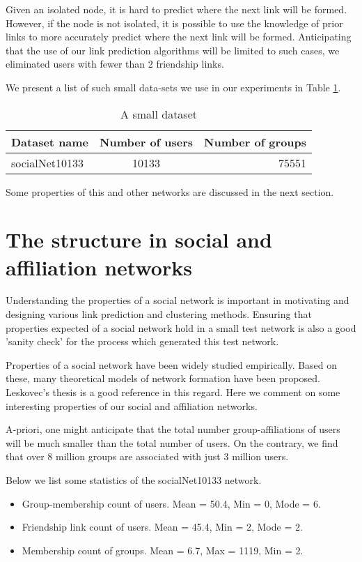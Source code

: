 \documentclass{report}
\begin{document}
Given an isolated node, it is hard to predict where the next link will be formed. However, if the node is not isolated, it is possible to use the knowledge of prior links to more accurately predict where the next link will be formed. Anticipating that the use of our link prediction algorithms will be limited to such cases, we eliminated users with fewer than 2 friendship links.

We present a list of such small data-sets we use in our experiments in Table \ref{tab:datasets}.
\begin{table}
\centering
\begin{tabular}{|l || c | r |}
\hline
Dataset name& Number of users & Number of groups\\
\hline
socialNet10133 & 10133 & 75551\\
\hline
\end{tabular}
\caption{A small dataset}
\label{tab:datasets}
\end{table}
Some properties of this and other networks are discussed in the next section.

\section{The structure in social and affiliation networks}
Understanding the properties of a social network is important in motivating and designing various link prediction and clustering methods. Ensuring that properties expected of a social network hold in a small test network is also a good 'sanity check' for the process which generated this test network.

Properties of a social network have been widely studied empirically. Based on these, many theoretical models of network formation have been proposed. Leskovec's thesis \cite{leskovecThesis} is a good reference in this regard. Here we comment on some interesting properties of our social and affiliation networks.

A-priori, one might anticipate that the total number group-affiliations of users will be much smaller than the total number of users. On the contrary, we find that over 8 million groups are associated with just 3 million users.

Below we list some statistics of the socialNet10133 network.
\begin{itemize}
 \item Group-membership count of users. Mean = 50.4, Min = 0, Mode = 6.
 \item Friendship link count of users. Mean = 45.4, Min = 2, Mode = 2.
 \item Membership count of groups. Mean = 6.7, Max = 1119, Min = 2.
\end{itemize}
\end{document}

